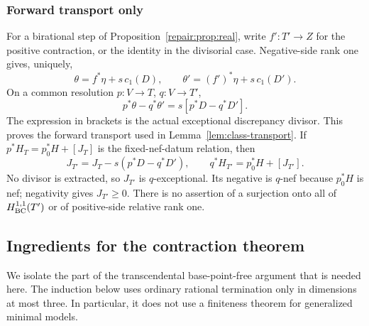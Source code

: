 \subsubsection{Forward transport only}
For a birational step of Proposition~\ref{repair:prop:real}, write
$f':T'\to Z$ for the positive contraction, or the identity in the
divisorial case. Negative-side rank one gives, uniquely,
\[
 \theta=f^*\eta+s\,c_1(D),\qquad
 \theta'=(f')^*\eta+s\,c_1(D').
\]
On a common resolution $p:V\to T$, $q:V\to T'$,
\[
 p^*\theta-q^*\theta'=s[p^*D-q^*D'].
\]
The expression in brackets is the actual exceptional discrepancy
divisor. This proves the forward transport used in Lemma~\ref{lem:class-transport}. If $p^*H_T=p_0^*H+[J_T]$ is the fixed-nef-datum relation,
then
\[
 J_{T'}=J_T-s(p^*D-q^*D'),\qquad
 q^*H_{T'}=p_0^*H+[J_{T'}].
\]
No divisor is extracted, so $J_{T'}$ is $q$-exceptional. Its negative
is $q$-nef because $p_0^*H$ is nef; negativity gives $J_{T'}\geq0$.
There is no assertion of a surjection onto all of $H^{1,1}_{\mathrm{BC}}(T')$ or of
positive-side relative rank one.

\subsection{Ingredients for the contraction theorem}
\label{repair:subsec:bounded-bpf-induction}

We isolate the part of the transcendental base-point-free argument that
is needed here. The induction below uses ordinary rational termination
only in dimensions at most three. In particular, it does not use a
finiteness theorem for generalized minimal models.

